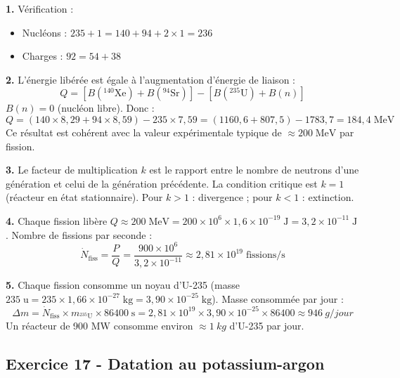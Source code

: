 \documentclass[12pt,a4paper]{article}
\begin{document}
\begin{boitecorrige}
\textbf{1.} Vérification :
\begin{itemize}[nosep]
  \item Nucléons : $235+1 = 140+94+2\times1 = 236$
  \item Charges : $92 = 54+38$
\end{itemize}

\textbf{2.} L'énergie libérée est égale à l'augmentation d'énergie de liaison :
\[
Q = [B({}^{140}\text{Xe})+B({}^{94}\text{Sr})] - [B({}^{235}\text{U})+B(n)]
\]
$B(n)=0$ (nucléon libre). Donc :
\[
Q = (140\times8{,}29 + 94\times8{,}59) - 235\times7{,}59 = (1160{,}6 + 807{,}5) - 1783{,}7 = 184{,}4\;\text{MeV}
\]
Ce résultat est cohérent avec la valeur expérimentale typique de $\approx200\;\text{MeV}$ par fission.

\textbf{3.} Le facteur de multiplication $k$ est le rapport entre le nombre de neutrons d'une génération et celui de la génération précédente. La condition critique est $k=1$ (réacteur en état stationnaire). Pour $k>1$ : divergence ; pour $k<1$ : extinction.

\textbf{4.} Chaque fission libère $Q\approx200\;\text{MeV}=200\times10^6\times1{,}6\times10^{-19}\;\text{J}=3{,}2\times10^{-11}\;\text{J}$.
Nombre de fissions par seconde :
\[
\dot N_\text{fiss} = \frac{P}{Q} = \frac{900\times10^6}{3{,}2\times10^{-11}} \approx 2{,}81\times10^{19}\;\text{fissions/s}
\]

\textbf{5.} Chaque fission consomme un noyau d'U-235 (masse $235\;\text{u}=235\times1{,}66\times10^{-27}\;\text{kg}=3{,}90\times10^{-25}\;\text{kg}$).
Masse consommée par jour :
\[
\Delta m = \dot N_\text{fiss}\times m_{{}^{235}\text{U}}\times86400\;\text{s} = 2{,}81\times10^{19}\times3{,}90\times10^{-25}\times86400 \approx \qty{946}{g/jour}
\]
Un réacteur de 900 MW consomme environ $\approx \qty{1}{kg}$ d'U-235 par jour.
\end{boitecorrige}

\subsection*{Exercice 17 - Datation au potassium-argon \niveau{\moyen}}
\end{document}
